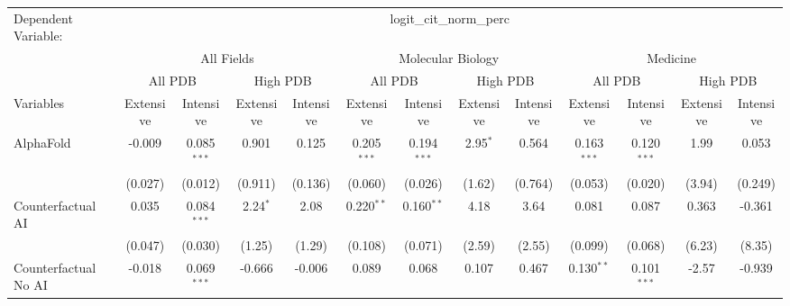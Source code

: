 \begingroup
\centering
\begin{tabular}{lcccccccccccc}
   \tabularnewline \midrule \midrule
   Dependent Variable: & \multicolumn{12}{c}{logit\_cit\_norm\_perc}\\
 & \multicolumn{4}{c}{All Fields} & \multicolumn{4}{c}{Molecular Biology} & \multicolumn{4}{c}{Medicine} \\
\cmidrule(lr){2-5} \cmidrule(lr){6-9} \cmidrule(lr){10-13}
 & \multicolumn{2}{c}{All PDB} & \multicolumn{2}{c}{High PDB} & \multicolumn{2}{c}{All PDB} & \multicolumn{2}{c}{High PDB} & \multicolumn{2}{c}{All PDB} & \multicolumn{2}{c}{High PDB} \\
\cmidrule(lr){2-3} \cmidrule(lr){4-5} \cmidrule(lr){6-7} \cmidrule(lr){8-9} \cmidrule(lr){10-11} \cmidrule(lr){12-13}
Variables & \multicolumn{1}{c}{Extensive} & \multicolumn{1}{c}{Intensive} & \multicolumn{1}{c}{Extensive} & \multicolumn{1}{c}{Intensive} & \multicolumn{1}{c}{Extensive} & \multicolumn{1}{c}{Intensive} & \multicolumn{1}{c}{Extensive} & \multicolumn{1}{c}{Intensive} & \multicolumn{1}{c}{Extensive} & \multicolumn{1}{c}{Intensive} & \multicolumn{1}{c}{Extensive} & \multicolumn{1}{c}{Intensive} \\
\cmidrule(lr){1-1}\cmidrule(lr){2-2} \cmidrule(lr){3-3} \cmidrule(lr){4-4} \cmidrule(lr){5-5} \cmidrule(lr){6-6} \cmidrule(lr){7-7} \cmidrule(lr){8-8} \cmidrule(lr){9-9} \cmidrule(lr){10-10} \cmidrule(lr){11-11} \cmidrule(lr){12-12} \cmidrule(lr){13-13}
   AlphaFold                                & -0.009       & 0.085$^{***}$  & 0.901      & 0.125   & 0.205$^{***}$ & 0.194$^{***}$ & 2.95$^{*}$  & 0.564   & 0.163$^{***}$ & 0.120$^{***}$  & 1.99   & 0.053\\   
                                            & (0.027)      & (0.012)        & (0.911)    & (0.136) & (0.060)       & (0.026)       & (1.62)      & (0.764) & (0.053)       & (0.020)        & (3.94) & (0.249)\\   
   Counterfactual AI                        & 0.035        & 0.084$^{***}$  & 2.24$^{*}$ & 2.08    & 0.220$^{**}$  & 0.160$^{**}$  & 4.18        & 3.64    & 0.081         & 0.087          & 0.363  & -0.361\\   
                                            & (0.047)      & (0.030)        & (1.25)     & (1.29)  & (0.108)       & (0.071)       & (2.59)      & (2.55)  & (0.099)       & (0.068)        & (6.23) & (8.35)\\   
   Counterfactual No AI                     & -0.018       & 0.069$^{***}$  & -0.666     & -0.006  & 0.089         & 0.068         & 0.107       & 0.467   & 0.130$^{**}$  & 0.101$^{***}$  & -2.57  & -0.939\\   

\end{tabular}
